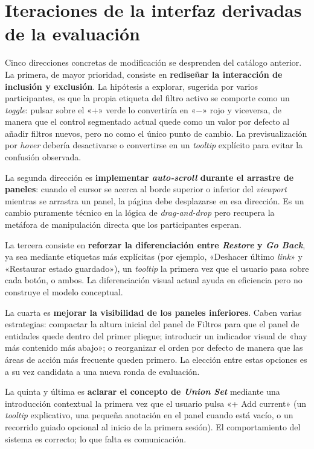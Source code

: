 \section{Iteraciones de la interfaz derivadas de la evaluación}
\label{sec:iteracionesUI}

Cinco direcciones concretas de modificación se desprenden del catálogo anterior. La primera,
de mayor prioridad, consiste en \textbf{rediseñar la interacción de inclusión y exclusión}.
La hipótesis a explorar, sugerida por varios participantes, es que la propia etiqueta del
filtro activo se comporte como un \textit{toggle}: pulsar sobre el «+» verde lo convertiría en
«$-$» rojo y viceversa, de manera que el control segmentado actual quede como un valor
por defecto al añadir filtros nuevos, pero no como el único punto de cambio. La previsualización
por \textit{hover} debería desactivarse o convertirse en un \textit{tooltip} explícito para
evitar la confusión observada.

La segunda dirección es \textbf{implementar \textit{auto-scroll} durante el arrastre de paneles}:
cuando el cursor se acerca al borde superior o inferior del \textit{viewport} mientras se
arrastra un panel, la página debe desplazarse en esa dirección. Es un cambio puramente técnico
en la lógica de \textit{drag-and-drop} pero recupera la metáfora de manipulación directa que
los participantes esperan.

La tercera consiste en \textbf{reforzar la diferenciación entre \textit{Restore} y \textit{Go Back}},
ya sea mediante etiquetas más explícitas (por ejemplo, «Deshacer último \textit{link}» y
«Restaurar estado guardado»), un \textit{tooltip} la primera vez que el usuario pasa
sobre cada botón, o ambos. La diferenciación visual actual ayuda en eficiencia pero no
construye el modelo conceptual.

La cuarta es \textbf{mejorar la visibilidad de los paneles inferiores}. Caben varias
estrategias: compactar la altura inicial del panel de Filtros para que el panel de
entidades quede dentro del primer pliegue; introducir un indicador visual de «hay más
contenido más abajo»; o reorganizar el orden por defecto de manera que las áreas de
acción más frecuente queden primero. La elección entre estas opciones es a su vez
candidata a una nueva ronda de evaluación.

La quinta y última es \textbf{aclarar el concepto de \textit{Union Set}} mediante una
introducción contextual la primera vez que el usuario pulsa «+ Add current» (un
\textit{tooltip} explicativo, una pequeña anotación en el panel cuando está vacío, o un
recorrido guiado opcional al inicio de la primera sesión). El comportamiento del sistema
es correcto; lo que falta es comunicación.


